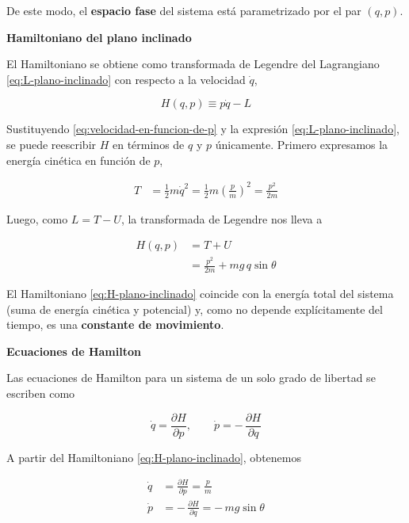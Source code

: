 \documentclass{article}
\begin{document}
De este modo, el \textbf{espacio fase} del sistema está parametrizado por el par
\((q,p)\).

\vspace{0.5cm}
\textbf{Hamiltoniano del plano inclinado}

El Hamiltoniano se obtiene como transformada de Legendre del Lagrangiano
\eqref{eq:L-plano-inclinado} con respecto a la velocidad \(\dot q\),

\[
H(q,p) \equiv p\dot q - L
\]

Sustituyendo \eqref{eq:velocidad-en-funcion-de-p} y la expresión
\eqref{eq:L-plano-inclinado}, se puede reescribir \(H\) en términos de \(q\) y \(p\)
únicamente. Primero expresamos la energía cinética en función de \(p\),

\begin{equation}
\begin{split}
T &= \frac{1}{2}m\dot q^{2}
   = \frac{1}{2}m\left(\frac{p}{m}\right)^{2}
   = \frac{p^{2}}{2m}
\end{split}\label{eq:T-en-p-plano-inclinado}
\end{equation}

Luego, como \(L = T - U\), la transformada de Legendre nos lleva a

\begin{equation}
\begin{split}
H(q,p)
&= T + U \\[4pt]
&= \frac{p^{2}}{2m} + m g\,q\sin\theta
\end{split}\label{eq:H-plano-inclinado}
\end{equation}

El Hamiltoniano \eqref{eq:H-plano-inclinado} coincide con la energía total del
sistema (suma de energía cinética y potencial) y, como no depende explícitamente del
tiempo, es una \textbf{constante de movimiento}.

\vspace{0.5cm}
\textbf{Ecuaciones de Hamilton}

Las ecuaciones de Hamilton para un sistema de un solo grado de libertad se escriben
como

\[
\dot q = \frac{\partial H}{\partial p},
\qquad
\dot p = -\,\frac{\partial H}{\partial q}
\]

A partir del Hamiltoniano \eqref{eq:H-plano-inclinado}, obtenemos

\begin{equation}
\begin{split}
\dot q &= \frac{\partial H}{\partial p}
       = \frac{p}{m} \\[4pt]
\dot p &= -\,\frac{\partial H}{\partial q}
       = -\,m g\sin\theta
\end{split}\label{eq:ecuaciones-H-plano-inclinado}
\end{equation}
\end{document}
